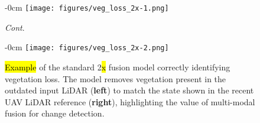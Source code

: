 \documentclass[remotesensing,article,accept,pdftex,moreauthors]{Definitions/mdpi}
\begin{document}
\vspace{-11pt}

\begin{figure}[H]
\begin{adjustwidth}{-\extralength}{0cm}
    \centering
    \texttt{[image: figures/veg\_loss\_2x-1.png]}
    \end{adjustwidth}
    \caption{\textit{Cont}.}
   \label{fig:appendix_loss}
\end{figure} 


\begin{figure}[H]\ContinuedFloat
\begin{adjustwidth}{-\extralength}{0cm}
    \centering
    \texttt{[image: figures/veg\_loss\_2x-2.png]}
    \end{adjustwidth}
    \caption{\hl{Example} %
 of the standard 2\hl{x} %
 fusion model correctly identifying vegetation loss. The model removes vegetation  present in the outdated input LiDAR (\textbf{left}) to match the  state shown in the recent UAV LiDAR reference (\textbf{right}), highlighting the value of multi-modal fusion for change detection.}
   \label{fig:appendix_loss}
\end{figure} 




% 
\end{document}
